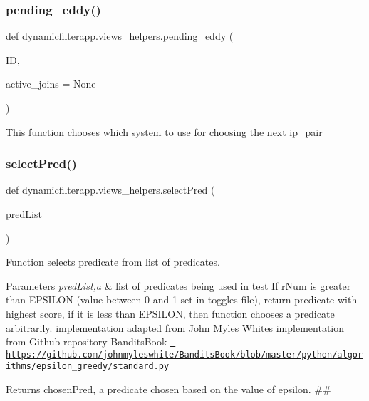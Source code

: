 \subsubsection{\texorpdfstring{pending\_eddy()}{pending\_eddy()}}
{\footnotesize\ttfamily def dynamicfilterapp.\+views\+\_\+helpers.\+pending\+\_\+eddy (\begin{DoxyParamCaption}\item[{}]{ID,  }\item[{}]{active\+\_\+joins = {\ttfamily None} }\end{DoxyParamCaption})}

\begin{DoxyVerb}This function chooses which system to use for choosing the next ip_pair
\end{DoxyVerb}
 \mbox{\label{namespacedynamicfilterapp_1_1views__helpers_a76037300b9b8c326be6d116519d5a8b9}} 
\subsubsection{\texorpdfstring{selectPred()}{selectPred()}}
{\footnotesize\ttfamily def dynamicfilterapp.\+views\+\_\+helpers.\+select\+Pred (\begin{DoxyParamCaption}\item[{}]{pred\+List }\end{DoxyParamCaption})}



Function selects predicate from list of predicates. 


\begin{DoxyParams}{Parameters}
{\em pred\+List,a} & list of predicates being used in test If r\+Num is greater than E\+P\+S\+I\+L\+ON (value between 0 and 1 set in toggles file), return predicate with highest score, if it is less than E\+P\+S\+I\+L\+ON, then function chooses a predicate arbitrarily. implementation adapted from John Myles White\textquotesingle{}s implementation from Github repository Bandits\+Book \href{https://github.com/johnmyleswhite/BanditsBook/blob/master/python/algorithms/epsilon_greedy/standard.py}{\texttt{ https\+://github.\+com/johnmyleswhite/\+Bandits\+Book/blob/master/python/algorithms/epsilon\+\_\+greedy/standard.\+py}} \\
\hline
\end{DoxyParams}
\begin{DoxyReturn}{Returns}
chosen\+Pred, a predicate chosen based on the value of epsilon. \#\# 
\end{DoxyReturn}
\mbox{\label{namespacedynamicfilterapp_1_1views__helpers_a57d6ebd6f2f99cba59b82eded490891f}} 
